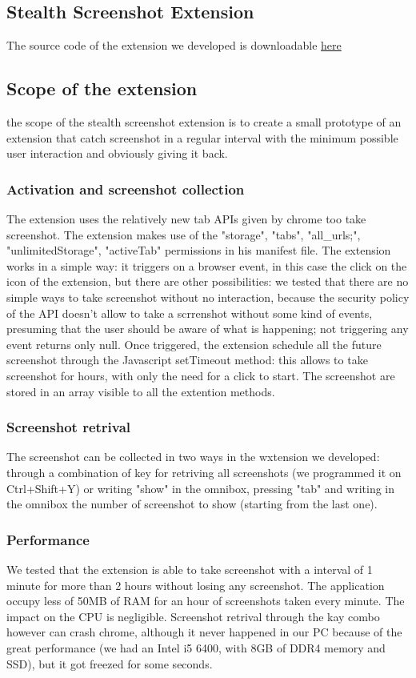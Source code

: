 \documentclass[12pt]{article}
\begin{document}
\begin{multicols}{2}
\section*{Stealth Screenshot Extension}
The source code of the extension we developed is downloadable \href{https://github.com/Trexy94/Stealth-screenshot}{here}
\subsection*{Scope of the extension}
the scope of the stealth screenshot extension is to create a small prototype of an extension that catch screenshot in a regular interval with the minimum possible user interaction and obviously giving it back.
\subsubsection*{Activation and screenshot collection}
The extension uses the relatively new tab APIs given by chrome too take screenshot.
The extension makes use of the "storage", "tabs", "all\_urls;", "unlimitedStorage", "activeTab" permissions in his manifest file. The extension works in a simple way: it triggers on a browser event, in this case the click on the icon of the extension, but there are other possibilities: we tested that there are no simple ways to take screenshot without no interaction, because the security policy of the API doesn't allow to take a scrrenshot without some kind of events, presuming that the user should be aware of what is happening; not triggering any event returns only null.
Once triggered, the extension schedule all the future screenshot through the Javascript setTimeout method: this allows to take screenshot for hours, with only the need for a click to start.
The screenshot are stored in an array visible to all the extention methods.
\subsubsection*{Screenshot retrival}
The screenshot can be collected in two ways in the wxtension we developed:
through a combination of key for retriving all screenshots (we programmed it on Ctrl+Shift+Y) or writing "show" in the omnibox, pressing "tab" and writing in the omnibox the number of screenshot to show (starting from the last one).
\subsubsection*{Performance}
We tested that the extension is able to take screenshot with a interval of 1 minute for more than 2 hours without losing any screenshot.
The application occupy less of 50MB of RAM for an hour of screenshots taken every minute. The impact on the CPU is negligible.
Screenshot retrival through the kay combo however can  crash chrome, although it never happened in our PC because of the great performance (we had an Intel i5 6400, with 8GB of DDR4 memory and SSD), but it got freezed for some seconds.

\end{multicols}
\end{document}
